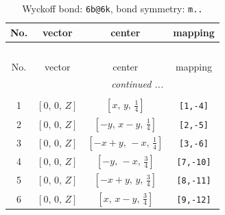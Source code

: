 \documentclass[fleqn,8pt]{jsarticle}
\begin{document}
\begin{longtable}{cccc}
\caption{Wyckoff bond: {\tt 6b@6k}, bond symmetry: {\tt m..}}
 \\
 \hline \hline
No. & vector & center & mapping \\ \hline \endfirsthead

\multicolumn{3}{l}{\tablename\ \thetable{}} \\
 \hline \hline
No. & vector & center & mapping \\ \hline \endhead

 \hline \hline
\multicolumn{3}{r}{\footnotesize\it continued ...} \\ \endfoot

 \hline \hline
\multicolumn{3}{r}{} \\ \endlastfoot

1 & $\left[ 0,\, 0,\, Z \right]$ & $\left[ x,\, y,\, \frac{1}{4} \right]$ & {\tt [1,-4]} \\ \hline
2 & $\left[ 0,\, 0,\, Z \right]$ & $\left[ - y,\, x - y,\, \frac{1}{4} \right]$ & {\tt [2,-5]} \\ \hline
3 & $\left[ 0,\, 0,\, Z \right]$ & $\left[ - x + y,\, - x,\, \frac{1}{4} \right]$ & {\tt [3,-6]} \\ \hline
4 & $\left[ 0,\, 0,\, Z \right]$ & $\left[ - y,\, - x,\, \frac{3}{4} \right]$ & {\tt [7,-10]} \\ \hline
5 & $\left[ 0,\, 0,\, Z \right]$ & $\left[ - x + y,\, y,\, \frac{3}{4} \right]$ & {\tt [8,-11]} \\ \hline
6 & $\left[ 0,\, 0,\, Z \right]$ & $\left[ x,\, x - y,\, \frac{3}{4} \right]$ & {\tt [9,-12]} \\
\end{longtable}
\renewcommand{\arraystretch}{1.2}
\end{document}

